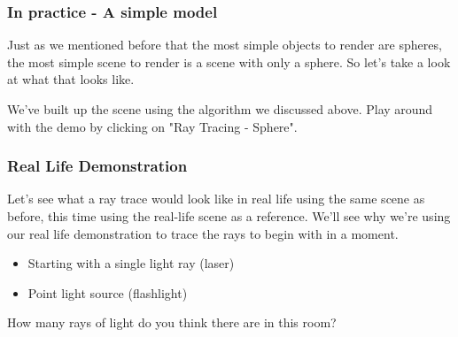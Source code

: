 \documentclass[12pt]{beamer}
\begin{document}
  \begin{frame}
    \frametitle{In practice - A simple model}

    Just as we mentioned before that the most simple objects to render are spheres, the most simple scene to render is a scene with only a sphere.
    So let's take a look at what that looks like.

    We've built up the scene using the algorithm we discussed above.
    Play around with the demo by clicking on "Ray Tracing - Sphere".



  \end{frame}

  \begin{frame}
    \frametitle{Real Life Demonstration}

    Let's see what a ray trace would look like in real life using the same scene as before, this time using the real-life scene as a reference.
    We'll see why we're using our real life demonstration to trace the rays to begin with in a moment.


    \begin{itemize}
      \item Starting with a single light ray (laser)
      \item Point light source (flashlight)
    \end{itemize}

  \end{frame}

  \begin{frame}

    How many rays of light do you think there are in this room?

  \end{frame}
\end{document}
